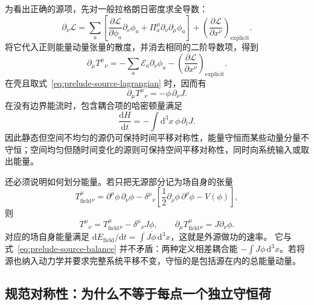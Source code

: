 为看出正确的源项，先对一般拉格朗日密度求全导数：
\begin{equation}
  \partial_{\nu}\mathcal{L}
  =\sum_{a}\left[
    \frac{\partial\mathcal{L}}{\partial\phi_{a}}\partial_{\nu}\phi_{a}
    +\Pi_{a}^{\mu}\partial_{\nu}\partial_{\mu}\phi_{a}\right]
    +\left(\frac{\partial\mathcal{L}}{\partial x^{\nu}}\right)_{\mathrm{explicit}}.
\end{equation}
将它代入正则能量动量张量的散度，并消去相同的二阶导数项，得到
\begin{equation}
  \partial_{\mu}T^{\mu}{}_{\nu}
  =-\sum_{a}\mathcal{E}_{a}\partial_{\nu}\phi_{a}
    -\left(\frac{\partial\mathcal{L}}{\partial x^{\nu}}\right)_{\mathrm{explicit}}.
\end{equation}
在壳且取式~\eqref{eq:prelude-source-lagrangian} 时，因而有
\begin{equation}
  \partial_{\mu}T^{\mu}{}_{\nu}=-\phi\,\partial_{\nu}J.
  \label{eq:prelude-source-balance}
\end{equation}
在没有边界能流时，包含耦合项的哈密顿量满足
\begin{equation}
  \frac{\mathrm{d}H}{\mathrm{d}t}
  =-\int\mathrm{d}^{3}x\,\phi\,\partial_{t}J.
\end{equation}
因此静态但空间不均匀的源仍可保持时间平移对称性，能量守恒而某些动量分量不守恒；空间均匀但随时间变化的源则可保持空间平移对称性，同时向系统输入或取出能量。

还必须说明如何划分能量。若只把无源部分记为场自身的张量
\begin{equation}
  T_{\mathrm{field}}^{\mu}{}_{\nu}
  =\partial^{\mu}\phi\,\partial_{\nu}\phi
  -\delta^{\mu}{}_{\nu}
   \left[\frac12\partial_{\rho}\phi\,\partial^{\rho}\phi-V(\phi)\right],
\end{equation}
则
\begin{equation}
  T^{\mu}{}_{\nu}=T_{\mathrm{field}}^{\mu}{}_{\nu}
    -\delta^{\mu}{}_{\nu}J\phi,\qquad
  \partial_{\mu}T_{\mathrm{field}}^{\mu}{}_{\nu}=J\partial_{\nu}\phi.
\end{equation}
对应的场自身能量满足 $\mathrm{d}E_{\mathrm{field}}/\mathrm{d}t
=\int J\dot\phi\,\mathrm{d}^{3}x$，这就是外源做功的速率。
它与式~\eqref{eq:prelude-source-balance} 并不矛盾：两种定义相差耦合能
$-\int J\phi\,\mathrm{d}^{3}x$。若将源也纳入动力学并要求完整系统平移不变，守恒的是包括源在内的总能量动量。

\subsection{规范对称性：为什么不等于每点一个独立守恒荷}

